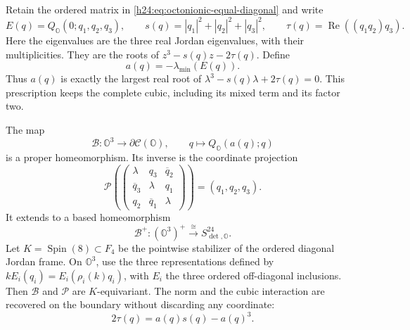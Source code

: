 Retain the ordered matrix in \eqref{h24:eq:octonionic-equal-diagonal} and write
\[
 E(q)=Q_{\mathbb O}(0;q_1,q_2,q_3),\qquad
 s(q)=|q_1|^2+|q_2|^2+|q_3|^2,\qquad
 \tau(q)=\operatorname{Re}((q_1q_2)q_3).
\]
Here the eigenvalues are the three real Jordan eigenvalues, with their
multiplicities. They are the roots of
\(z^3-s(q)z-2\tau(q)\). Define
\[
 a(q)=-\lambda_{\min}(E(q)).
\]
Thus \(a(q)\) is exactly the largest real root of
\(\lambda^3-s(q)\lambda+2\tau(q)=0\). This prescription keeps the
complete cubic, including its mixed term and its factor two.

\begin{theorem}
\label{h24:tri:thm:spectral-graph}
The map
\begin{equation}
 \mathcal B:\mathbb O^3\longrightarrow\partial\mathcal C(\mathbb O),
 \qquad q\longmapsto Q_{\mathbb O}(a(q);q)
 \label{h24:tri:eq:spectral-graph}
\end{equation}
is a proper homeomorphism. Its inverse is the coordinate projection
\[
 \mathcal P\left(
 \begin{pmatrix}
 \lambda&q_3&\overline q_2\\
 \overline q_3&\lambda&q_1\\
 q_2&\overline q_1&\lambda
 \end{pmatrix}\right)=(q_1,q_2,q_3).
\]
It extends to a based homeomorphism
\[
 \mathcal B^+:(\mathbb O^3)^+
       \xrightarrow{\ \cong\ }S_{\det,\mathbb O}^{24}.
\]
Let \(K=\operatorname{Spin}(8)\subset F_4\) be the pointwise stabilizer
of the ordered diagonal Jordan frame. On \(\mathbb O^3\), use the
three representations defined by
\(kE_i(q_i)=E_i(\rho_i(k)q_i)\), with \(E_i\) the three ordered
off-diagonal inclusions. Then \(\mathcal B\) and \(\mathcal P\) are
\(K\)-equivariant. The norm and the cubic interaction are recovered
on the boundary without discarding any coordinate:
\begin{equation}
 2\tau(q)=a(q)s(q)-a(q)^3.
 \label{h24:tri:eq:boundary-triality}
\end{equation}
\end{theorem}


